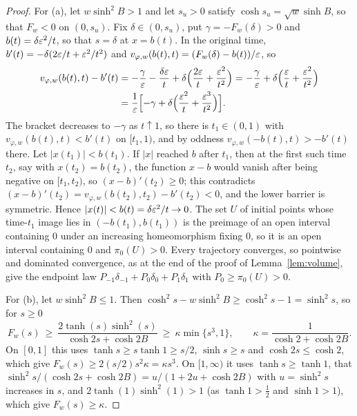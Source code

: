 \documentclass{article} %
\theoremstyle{plain}
\theoremstyle{definition}
\theoremstyle{remark}
\begin{document}
\begin{proof}
For (a), let $w\sinh^2B>1$ and let $s_u>0$ satisfy $\cosh s_u=\sqrt w\sinh B$, so that $F_w<0$ on
$(0,s_u)$. Fix $\delta\in(0,s_u)$, put $\gamma=-F_w(\delta)>0$ and $b(t)=\delta\varepsilon^2/t$, so that
$s=\delta$ at $x=b(t)$. In the original time, $b'(t)=-\delta(2\varepsilon/t+\varepsilon^2/t^2)$ and
$v_{\varphi,w}(b(t),t)=(F_w(\delta)-b(t))/\varepsilon$, so
\begin{align*}
v_{\varphi,w}(b(t),t)-b'(t)
&=-\frac\gamma{\varepsilon}-\frac{\delta\varepsilon}{t}+\delta\Bigl(\frac{2\varepsilon}t+\frac{\varepsilon^2}{t^2}\Bigr)
=-\frac\gamma{\varepsilon}+\delta\Bigl(\frac{\varepsilon}t+\frac{\varepsilon^2}{t^2}\Bigr)\\
&=\frac1{\varepsilon}\Bigl[-\gamma+\delta\Bigl(\frac{\varepsilon^2}t+\frac{\varepsilon^3}{t^2}\Bigr)\Bigr].
\end{align*}
The bracket decreases to $-\gamma$ as $t\uparrow1$, so there is $t_1\in(0,1)$ with
$v_{\varphi,w}(b(t),t)<b'(t)$ on $[t_1,1)$, and by oddness $v_{\varphi,w}(-b(t),t)>-b'(t)$ there.
Let $|x(t_1)|<b(t_1)$. If $|x|$ reached $b$ after $t_1$, then at the first such time $t_2$, say with
$x(t_2)=b(t_2)$, the function $x-b$ would vanish after being negative on $[t_1,t_2)$, so
$(x-b)'(t_2)\ge0$; this contradicts
$(x-b)'(t_2)=v_{\varphi,w}(b(t_2),t_2)-b'(t_2)<0$, and the lower barrier is symmetric. Hence
$|x(t)|<b(t)=\delta\varepsilon^2/t\to0$. The set $U$ of initial points whose time-$t_1$ image lies in
$(-b(t_1),b(t_1))$ is the preimage of an open interval containing $0$ under an increasing
homeomorphism fixing $0$, so it is an open interval containing $0$ and $\pi_0(U)>0$. Every trajectory
converges, so pointwise and dominated convergence, as at the end of the proof of
Lemma~\ref{lem:volume}, give the endpoint law $P_{-1}\delta_{-1}+P_0\delta_0+P_1\delta_1$ with
$P_0\ge\pi_0(U)>0$.

For (b), let $w\sinh^2B\le1$. Then $\cosh^2s-w\sinh^2B\ge\cosh^2s-1=\sinh^2s$, so for $s\ge0$
\[
F_w(s)\ \ge\ \frac{2\tanh(s)\sinh^2(s)}{\cosh2s+\cosh2B}\ \ge\ \kappa\min\{s^3,1\},
\qquad\kappa=\frac1{\cosh2+\cosh2B}.
\]
On $[0,1]$ this uses $\tanh s\ge s\tanh1\ge s/2$, $\sinh s\ge s$ and $\cosh2s\le\cosh2$, which give
$F_w(s)\ge2(s/2)s^2\kappa=\kappa s^3$. On $[1,\infty)$ it uses $\tanh s\ge\tanh1$, that
$\sinh^2s/(\cosh2s+\cosh2B)=u/(1+2u+\cosh2B)$ with $u=\sinh^2s$ increases in $s$, and
$2\tanh(1)\sinh^2(1)>1$ (as $\tanh1>\tfrac12$ and $\sinh1>1$), which give $F_w(s)\ge\kappa$.


\end{proof}
\end{document}
